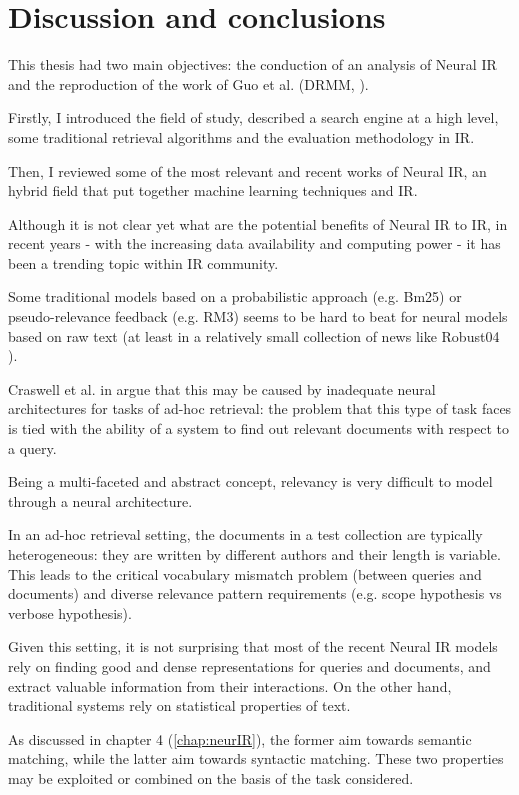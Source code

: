 \newpage
\chapter{Discussion and conclusions}

This thesis had two main objectives: the conduction of an analysis of Neural IR and the reproduction of the work of Guo et al. (DRMM, \cite{drmm}).

Firstly, I introduced the field of study, described a search engine at a high level, some traditional retrieval algorithms and the evaluation methodology in IR.

Then, I reviewed some of the most relevant and recent works of Neural IR, an hybrid field that put together machine learning techniques and IR.

Although it is not clear yet what are the potential benefits of Neural IR to IR, in recent years - with the increasing data availability and computing power - it has been a trending topic within IR community.

Some traditional models based on a probabilistic approach (e.g. Bm25) or pseudo-relevance feedback (e.g. RM3) seems to be hard to beat for neural models based on raw text (at least in a relatively small collection of news like Robust04 \cite{rob04}).

Craswell et al. in \cite{nn4ir} argue that this may be caused by inadequate neural architectures for tasks of ad-hoc retrieval: the problem that this type of task faces is tied with the ability of a system to find out relevant documents with respect to a query.

Being a multi-faceted and abstract concept, relevancy is very difficult to model through a neural architecture.

In an ad-hoc retrieval setting, the documents in a test collection are typically heterogeneous: they are written by different authors and their length is variable. This leads to the critical vocabulary mismatch problem (between queries and documents) and diverse relevance pattern requirements (e.g. scope hypothesis vs verbose hypothesis).

Given this setting, it is not surprising that most of the recent Neural IR models rely on finding good and dense representations for queries and documents, and extract valuable information from their interactions. On the other hand, traditional systems rely on statistical properties of text.

As discussed in chapter 4 (\ref{chap:neurIR}), the former aim towards semantic matching, while the latter aim towards syntactic matching. These two properties may be exploited or combined on the basis of the task considered.

